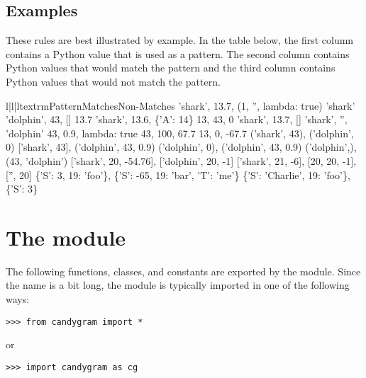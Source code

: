 \documentclass{howto}
\newcommand{\lessthan}[0]{\begin{math}<\end{math}}
\newcommand{\greaterthan}[0]{\begin{math}>\end{math}}
\newcommand{\lessthan}[0]{<}
\newcommand{\greaterthan}[0]{>}
\begin{document}
\subsection{Examples}
These rules are best illustrated by example. In the table below, the first
column contains a Python value that is used as a pattern. The second column
contains Python values that would match the pattern and the third column
contains Python values that would not match the pattern.
\begin{tableiii}{l|l|l}{textrm}{Pattern}{Matches}{Non-Matches}
	{'shark', 13.7, (1, '', lambda: true)}
	{}
	{'shark'}
	{'dolphin', 43, []}
	{13.7}
	{'shark', 13.6, \{'A': 14\}}
	{13, 43, 0}
	{'shark', 13.7, []}
	{'shark', '', 'dolphin'}
	{43, 0.9, lambda: true}
\lineiii{lambda x: x \greaterthan\ 20}
	{43, 100, 67.7}
	{13, 0, -67.7}
	{('shark', 43), ('dolphin', 0)}
	{['shark', 43], ('dolphin', 43, 0.9)}
	{('dolphin', 0), ('dolphin', 43, 0.9)}
	{('dolphin',), (43, 'dolphin')}
\lineiii{[str, 20, lambda x: x \lessthan\ 0]}
	{['shark', 20, -54.76], ['dolphin', 20, -1]}
	{['shark', 21, -6], [20, 20, -1], ['', 20]}
	{\{'S': 3, 19: 'foo'\}, \{'S': -65, 19: 'bar', 'T': 'me'\}}
	{\{'S': 'Charlie', 19: 'foo'\}, \{'S': 3\}}
\end{tableiii}



\section{The  module}


The following functions, classes, and constants are exported by the
 module. Since the name  is a bit long, the
module is typically imported in one of the following ways:
\begin{verbatim}
>>> from candygram import *
\end{verbatim}
or
\begin{verbatim}
>>> import candygram as cg
\end{verbatim}



\end{document}
